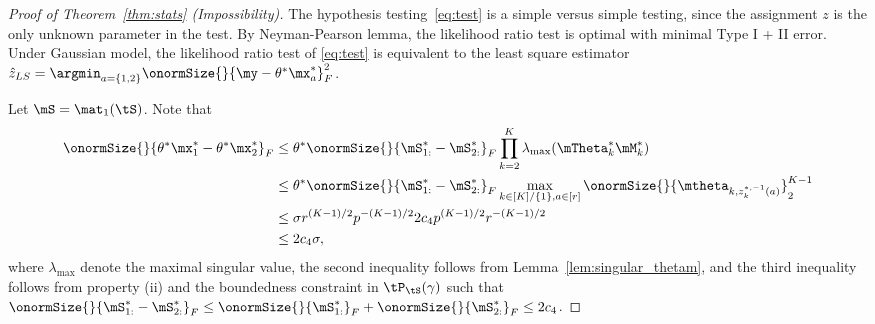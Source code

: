 \documentclass[lettersize,onecolumn,journal]{IEEEtran}
\theoremstyle{definition}
\theoremstyle{definition}
\begin{document}
{\begin{proof}[Proof of Theorem~\ref{thm:stats} (Impossibility)]
   The hypothesis testing~\eqref{eq:test} is a simple versus simple testing, since the assignment $z$ is the only unknown parameter in the test. 
   By Neyman-Pearson lemma, the likelihood ratio test is optimal with minimal Type I + II error. Under Gaussian model, the likelihood ratio test of \eqref{eq:test} is equivalent to the least square estimator $\hat z_{LS} = \argmin_{a = \{1,2\}} \onormSize{}{\my - \theta^* \mx_a^*}_F^2$. 
   
   Let $\mS = \mat_1(\tS)$. Note that 
   \begin{align}
       \onormSize{}{ \theta^* \mx_1^*  - \theta^* \mx_2^*}_F &\leq  \theta^* \onormSize{}{ \mS^*_{1:} - \mS^*_{2:} }_F \prod_{k = 2}^K \lambda_{\max}(\mTheta_k^*\mM_k^*)  \\
       & \leq \theta^* \onormSize{}{ \mS^*_{1:} - \mS^*_{2:} }_F   \max_{k \in [K]/\{1\}, a \in [r]} \onormSize{}{\mtheta_{k, z^{*, -1}_k(a)}}_2^{K-1} \\
       & \leq  \sigma r^{(K-1)/2} p^{-(K-1)/2} 2 c_4 p^{(K-1)/2} r^{-(K-1)/2}\\
       & \leq 2 c_4 \sigma, \label{eq:bound}
   \end{align}
   where $\lambda_{\max}$ denote the maximal singular value, the second inequality follows from Lemma~\ref{lem:singular_thetam}, and the third inequality follows from property (ii) and the boundedness constraint in $\tP_{\tS}(\gamma)$ such that $\onormSize{}{ \mS^*_{1:} - \mS^*_{2:} }_F  \leq \onormSize{}{\mS_{1:}^*}_F + \onormSize{}{\mS_{2:}^*}_F \leq 2c_4$.


\end{proof}}
\end{document}
